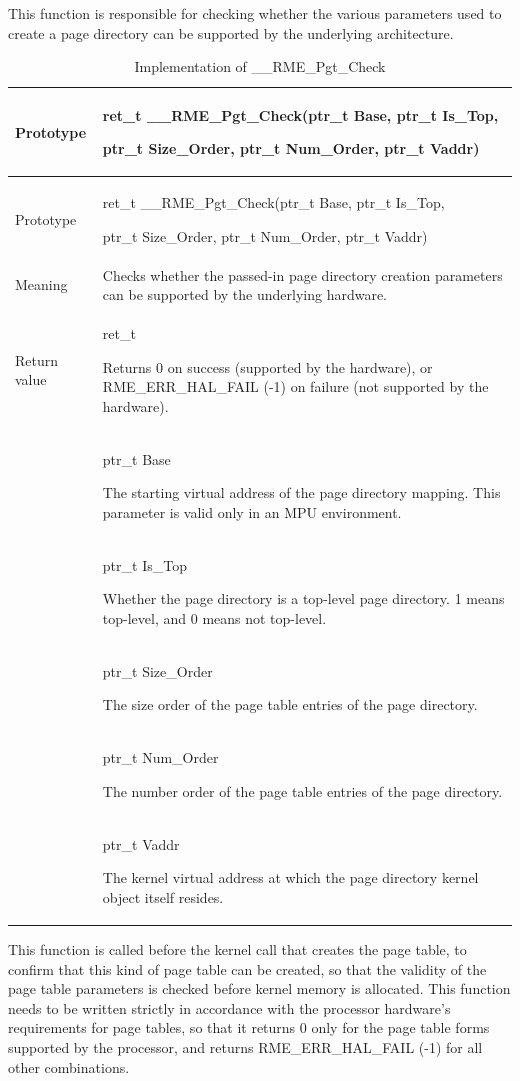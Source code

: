 This function is responsible for checking whether the various parameters used to create a page directory can be supported by the underlying architecture.

\begin{xltabular}{\textwidth}{@{}>{\hsize\raggedright\arraybackslash}X>{\hsize\raggedright\arraybackslash}X@{}}
\caption{Implementation of \_\_RME\_Pgt\_Check}\label{tab:7-76-rme-pgt-check-implementation}\\
\toprule
Prototype\strut
 & ret\_t \_\_RME\_Pgt\_Check(ptr\_t Base, ptr\_t Is\_Top,

ptr\_t Size\_Order, ptr\_t Num\_Order, ptr\_t Vaddr)\strut
\tabularnewline
\endfirsthead
\toprule
Prototype\strut
 & ret\_t \_\_RME\_Pgt\_Check(ptr\_t Base, ptr\_t Is\_Top,

ptr\_t Size\_Order, ptr\_t Num\_Order, ptr\_t Vaddr)\strut
\tabularnewline
\midrule
\endhead
\bottomrule
\endlastfoot
Meaning & Checks whether the passed-in page directory creation parameters can be supported by the underlying hardware.\tabularnewline
Return value\strut
 & ret\_t

Returns 0 on success (supported by the hardware), or RME\_ERR\_HAL\_FAIL (-1) on failure (not supported by the hardware).\strut
\tabularnewline
{} & ptr\_t Base

The starting virtual address of the page directory mapping. This parameter is valid only in an MPU environment.\strut
\tabularnewline
\strut
 & ptr\_t Is\_Top

Whether the page directory is a top-level page directory. 1 means top-level, and 0 means not top-level.\strut
\tabularnewline
\strut
 & ptr\_t Size\_Order

The size order of the page table entries of the page directory.\strut
\tabularnewline
\strut
 & ptr\_t Num\_Order

The number order of the page table entries of the page directory.\strut
\tabularnewline
\strut
 & ptr\_t Vaddr

The kernel virtual address at which the page directory kernel object itself resides.\strut
\tabularnewline
\end{xltabular}
\nopagebreak[4]

This function is called before the kernel call that creates the page table, to confirm that this kind of page table can be created, so that the validity of the page table parameters is checked before kernel memory is allocated. This function needs to be written strictly in accordance with the processor hardware's requirements for page tables, so that it returns 0 only for the page table forms supported by the processor, and returns RME\_ERR\_HAL\_FAIL (-1) for all other combinations.

